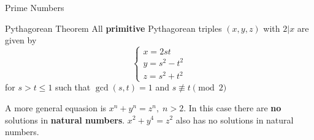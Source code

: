 \documentclass[12pt, letterpaper]{article}
\begin{document}
\begin{section}{Prime Numbers}
\begin{subsection}{Pythagorean Theorem}
    All \textbf{primitive} Pythagorean triples \((x, y, z)\) with \(2 | x\) are given by
    \[\begin{cases}
        x = 2st \\
        y = s^{2} - t^{2} \\
        z = s^{2} + t^{2}
      \end{cases}
    \]
    for \(s > t \leq 1\) such that \(\gcd(s, t) = 1\) and \(s \not\equiv t \pmod{2}\)

    A more general equasion is \(x^{n} + y^{n} = z^{n}, \; n > 2\). In this case
    there are \textbf{no} solutions in \textbf{natural numbers}.
    \(x^{2} + y^{4} = z^{2}\) also has no solutions in natural numbers.

  \end{subsection}

\end{section}
\end{document}
